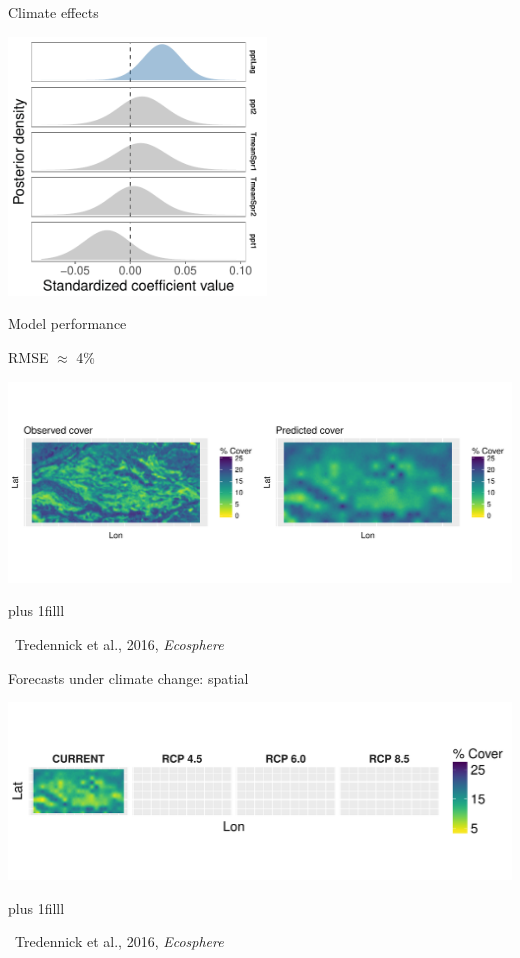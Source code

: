\documentclass[14pt, compress, aspectratio=1610]{beamer}
\newcommand{\btVFill}{\vskip0pt plus 1filll}
\newcommand{\credit}[1]{\btVFill\par\hfill \footnotesize ~#1}
\begin{document}
\begin{frame}{%
\protect\hypertarget{climate-effects}{%
Climate effects}}

\centering

\includegraphics[height=2.7in]{./figures/post_climate_covariates.pdf}

\end{frame}

\begin{frame}{%
\protect\hypertarget{model-performance}{%
Model performance}}

\small{RMSE $\approx$ 4\%}

\includegraphics[width=\textwidth]{./figures/obs_predict_spatial_pres.pdf}

\credit{Tredennick et al., 2016, \emph{Ecosphere}}

\end{frame}

\begin{frame}{%
\protect\hypertarget{forecasts-under-climate-change-spatial}{%
Forecasts under climate change: spatial}}

\includegraphics[width=\textwidth]{./figures/clim_change_mean_spatial_empty.pdf}

\credit{Tredennick et al., 2016, \emph{Ecosphere}}

\end{frame}
\end{document}
